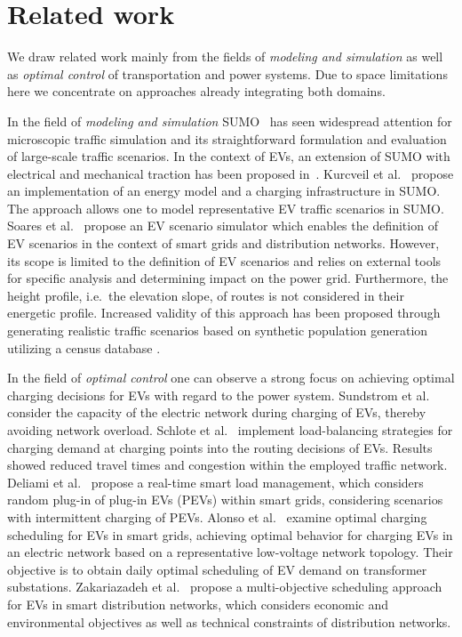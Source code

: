 \section{Related work}
\label{section:retrospection}

We draw related work mainly from the fields of \textit{modeling and simulation} as well as \textit{optimal control} of transportation and power systems. Due to space limitations here we concentrate on approaches already integrating both domains.

In the field of \textit{modeling and simulation} SUMO~\cite{behrisch2011sumo} has seen widespread attention for microscopic traffic simulation and its straightforward formulation and evaluation of large-scale traffic scenarios. In the context of EVs, an extension of SUMO with electrical and mechanical traction has been proposed in~\cite{maia2011electric}. Kurcveil et al.~\cite{kurczveil2014implementation} propose an implementation of an energy model and a charging infrastructure in SUMO. The approach allows one to model representative EV traffic scenarios in SUMO. Soares et al.~\cite{soares2012electric} propose an EV scenario simulator which enables the definition of EV scenarios in the context of smart grids and distribution networks. However, its scope is limited to the definition of EV scenarios and relies on external tools for specific analysis and determining impact on the power grid. Furthermore, the height profile, i.e.\ the elevation slope, of routes is not considered in their energetic profile. Increased validity of this approach has been proposed through generating realistic traffic scenarios based on synthetic population generation utilizing a census database \cite{soares2014realistic}.

In the field of \textit{optimal control} one can observe a strong focus on achieving optimal charging decisions for EVs with regard to the power system. Sundstrom et al.~\cite{sundstrom2010planning} consider the capacity of the electric network during charging of EVs, thereby avoiding network overload. Schlote et al.~\cite{schlote2012balanced} implement load-balancing strategies for charging demand at charging points into the routing decisions of EVs. Results showed reduced travel times and congestion within the employed traffic network. Deliami et al.~\cite{deilami2011real} propose a real-time smart load management, which considers random plug-in of plug-in EVs (PEVs) within smart grids, considering scenarios with intermittent charging of PEVs. Alonso et al.~\cite{alonso2014optimal} examine optimal charging scheduling for EVs in smart grids, achieving optimal behavior for charging EVs in an electric network based on a representative low-voltage network topology. Their objective is to obtain daily optimal scheduling of EV demand on transformer substations. Zakariazadeh et al.~\cite{zakariazadeh2014multi} propose a multi-objective scheduling approach for EVs in smart distribution networks, which considers economic and environmental objectives as well as technical constraints of distribution networks.

